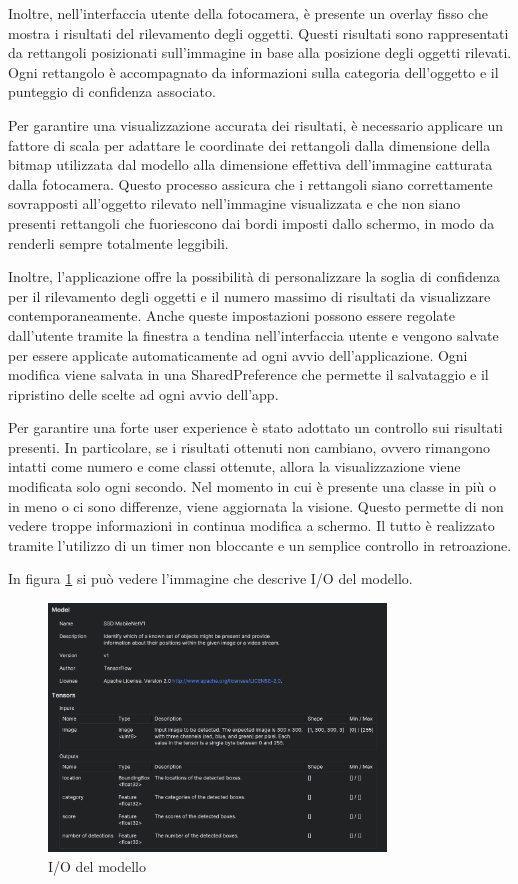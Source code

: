 Inoltre, nell'interfaccia utente della fotocamera, è presente un overlay fisso che mostra i risultati del rilevamento degli oggetti. Questi risultati sono
rappresentati da rettangoli posizionati sull'immagine in base alla posizione degli oggetti rilevati. Ogni rettangolo è accompagnato da informazioni sulla
categoria dell'oggetto e il punteggio di confidenza associato.

Per garantire una visualizzazione accurata dei risultati, è necessario applicare un fattore di scala per adattare le coordinate dei rettangoli dalla
dimensione della bitmap utilizzata dal modello alla dimensione effettiva dell'immagine catturata dalla fotocamera. Questo processo assicura che i rettangoli
siano correttamente sovrapposti all'oggetto rilevato nell'immagine visualizzata e che non siano presenti rettangoli che fuoriescono dai bordi imposti dallo
schermo, in modo da renderli sempre totalmente leggibili.

Inoltre, l'applicazione offre la possibilità di personalizzare la soglia di confidenza per il rilevamento degli oggetti e il numero massimo di risultati da
visualizzare contemporaneamente. Anche queste impostazioni possono essere regolate dall'utente tramite la finestra a tendina nell'interfaccia utente e
vengono salvate per essere applicate automaticamente ad ogni avvio dell'applicazione.
Ogni modifica viene salvata in una SharedPreference che permette il salvataggio e il ripristino delle scelte ad ogni avvio dell’app.

Per garantire una forte user experience è stato adottato un controllo sui risultati presenti. In particolare, se i risultati ottenuti non cambiano, ovvero
rimangono intatti come numero e come classi ottenute, allora la visualizzazione viene modificata solo ogni secondo. Nel momento in cui è presente una classe
in più o in meno o ci sono differenze, viene aggiornata la visione. Questo permette di non vedere troppe informazioni in continua modifica a schermo. Il
tutto è realizzato tramite l’utilizzo di un timer non bloccante e un semplice controllo in retroazione.

In figura \ref{fig:modello} si può vedere l’immagine che descrive I/O del modello.

\begin{figure}[ht]
    \centering
    \includegraphics[width=0.8\textwidth]{Immagini/App/modello.png}
    \caption{I/O del modello}
    \label{fig:modello}
\end{figure}
